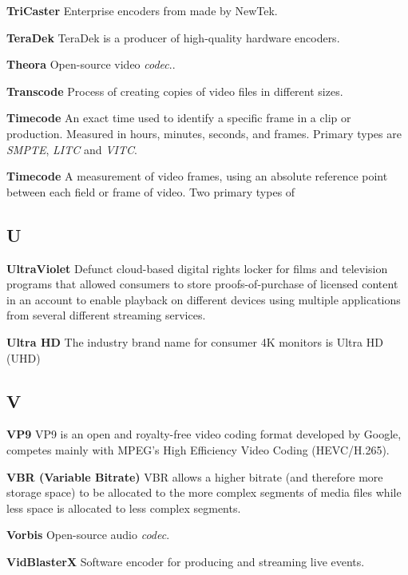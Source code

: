 \smallskip
\textbf{TriCaster}
Enterprise encoders from made by NewTek.

\smallskip
\textbf{TeraDek}
TeraDek is a producer of high-quality hardware encoders.


\smallskip
\textbf{Theora}
Open-source video \textit{codec}..

\smallskip
\textbf{Transcode}
Process of creating copies of video files in different sizes.

\smallskip
\textbf{Timecode}
An exact time used to identify a specific frame in a clip or production. Measured in hours, minutes, seconds, and frames. Primary types are \textit{SMPTE}, \textit{LITC} and \textit{VITC}.

\smallskip
\textbf{Timecode}
A measurement of video frames, using an absolute reference point between each field or frame of video. Two primary types of

\subsection{U}

\smallskip
\textbf{UltraViolet}
Defunct cloud-based digital rights locker for films and television programs that allowed consumers to store proofs-of-purchase of licensed content in an account to enable playback on different devices using multiple applications from several different streaming services.

\smallskip
\textbf{Ultra HD}
The industry brand name for consumer 4K monitors is Ultra HD (UHD)

\subsection{V}

\smallskip
\textbf{VP9}
VP9 is an open and royalty-free video coding format developed by Google, competes mainly with MPEG's High Efficiency Video Coding (HEVC/H.265).

\smallskip
\textbf{VBR (Variable Bitrate)}
VBR allows a higher bitrate (and therefore more storage space) to be allocated to the more complex segments of media files while less space is allocated to less complex segments.

\smallskip
\textbf{Vorbis}
Open-source audio \textit{codec}.

\smallskip
\textbf{VidBlasterX}
Software encoder for producing and streaming live events.

